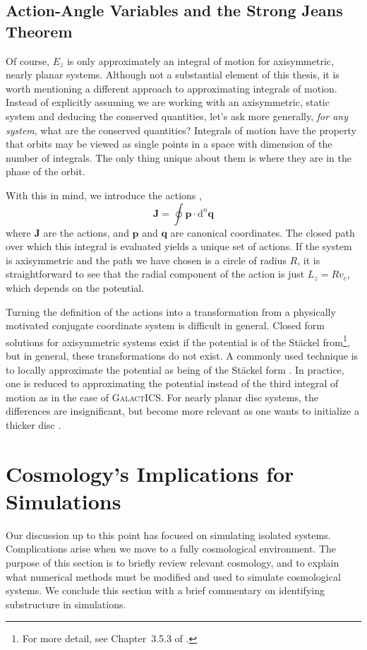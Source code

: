 \subsection{Action-Angle Variables and the Strong Jeans Theorem}

Of course, $E_z$ is only approximately an integral of motion for axisymmetric, nearly planar systems. Although not a substantial element of this thesis, it is worth mentioning a different approach to approximating integrals of motion. Instead of explicitly assuming we are working with an axisymmetric, static system and deducing the conserved quantities, let's ask more generally, \textit{for any system}, what are the conserved quantities? Integrals of motion have the property that orbits may be viewed as single points in a space with dimension of the number of integrals. The only thing unique about them is where they are in the phase of the orbit.

With this in mind, we introduce the actions \citep{BT},
\begin{equation}
\textbf{J} = \oint \textbf{p} \cdot \text{d}^n \textbf{q}
\end{equation}
where $\textbf{J}$ are the actions, and $\textbf{p}$ and $\textbf{q}$ are canonical coordinates. The closed path over which this integral is evaluated yields a unique set of actions. If the system is axisymmetric and the path we have chosen is a circle of radius $R$, it is straightforward to see that the radial component of the action is just $L_z = R v_c$, which depends on the potential. 

Turning the definition of the actions into a transformation from a physically motivated conjugate coordinate system is difficult in general. Closed form solutions for axisymmetric systems exist if the potential is of the St\"ackel from\footnote{For more detail, see Chapter~3.5.3 of \citet{BT}.}, but in general, these transformations do not exist. A commonly used technique is to locally approximate the potential as being of the St\"ackel form \citet{binney_2012}. In practice, one is reduced to approximating the potential instead of the third integral of motion as in the case of \textsc{GalactICS}. For nearly planar disc systems, the differences are insignificant, but become more relevant as one wants to initialize a thicker disc \citep{vasiliev_2018,bauer2018b}.


\section{Cosmology's Implications for Simulations} \label{sec:cosmology}
Our discussion up to this point has focused on simulating isolated systems. Complications arise when we move to a fully cosmological environment. The purpose of this section is to briefly review relevant cosmology, and to explain what numerical methods must be modified and used to simulate cosmological systems. We conclude this section with a brief commentary on identifying substructure in simulations.

